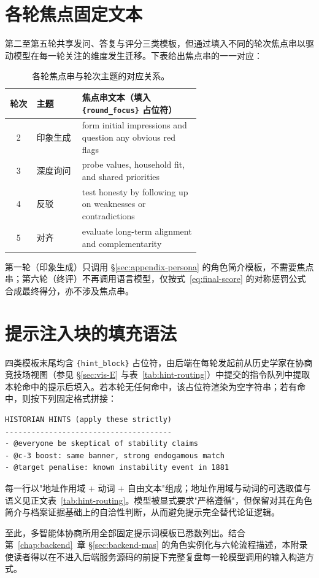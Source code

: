\section{各轮焦点固定文本}\label{sec:appendix-round-focus}

第二至第五轮共享发问、答复与评分三类模板，但通过填入不同的轮次焦点串以驱动模型在每一轮关注的维度发生迁移。下表给出焦点串的一一对应：

\begin{table}[!htbp]
\centering
\caption{各轮焦点串与轮次主题的对应关系。}
\label{tab:appendix-round-focus}
\footnotesize
\begin{tabular}{c l p{0.62\linewidth}}
\toprule
轮次 & 主题 & 焦点串文本（填入 \texttt{\{round\_focus\}} 占位符） \\
\midrule
2 & 印象生成 & form initial impressions and question any obvious red flags \\
3 & 深度询问 & probe values, household fit, and shared priorities \\
4 & 反驳 & test honesty by following up on weaknesses or contradictions \\
5 & 对齐 & evaluate long-term alignment and complementarity \\
\bottomrule
\end{tabular}
\end{table}

第一轮（印象生成）只调用 \S\ref{sec:appendix-persona} 的角色简介模板，不需要焦点串；第六轮（终评）不再调用语言模型，仅按式~\eqref{eq:final-score} 的对称惩罚公式合成最终得分，亦不涉及焦点串。

\section{提示注入块的填充语法}\label{sec:appendix-hint-block}

四类模板末尾均含 \texttt{\{hint\_block\}} 占位符，由后端在每轮发起前从历史学家在协商竞技场视图（参见 \S\ref{sec:vis-E} 与表~\ref{tab:hint-routing}）中提交的指令队列中提取本轮命中的提示后填入。若本轮无任何命中，该占位符渲染为空字符串；若有命中，则按下列固定格式拼接：

\begingroup\footnotesize
\begin{verbatim}
HISTORIAN HINTS (apply these strictly)
--------------------------------------
- @everyone be skeptical of stability claims
- @c-3 boost: same banner, strong endogamous match
- @target penalise: known instability event in 1881
\end{verbatim}
\endgroup

每一行以"地址作用域 + 动词 + 自由文本"组成；地址作用域与动词的可选取值与语义见正文表~\ref{tab:hint-routing}。模型被显式要求"严格遵循"，但保留对其在角色简介与档案证据基础上的自洽性判断，从而避免提示完全替代论证逻辑。

至此，多智能体协商所用全部固定提示词模板已悉数列出。结合第~\ref{chap:backend}~章 \S\ref{sec:backend-mas} 的角色实例化与六轮流程描述，本附录使读者得以在不进入后端服务源码的前提下完整复盘每一轮模型调用的输入构造方式。
